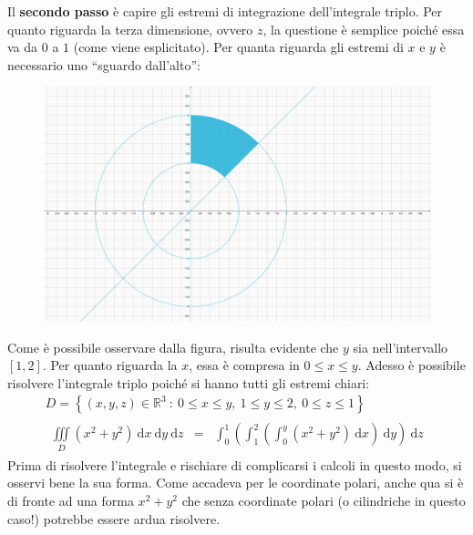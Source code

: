 \documentclass[a4paper]{article}
\newcommand{\dquotes}[1]{``#1''}
\begin{document}
	\noindent
	Il \textbf{secondo passo} è capire gli estremi di integrazione dell'integrale triplo. Per quanto riguarda la terza dimensione, ovvero $z$, la questione è semplice poiché essa va da $0$ a $1$ (come viene esplicitato). Per quanta riguarda gli estremi di $x$ e $y$ è necessario uno \dquotes{sguardo dall'alto}:
	\begin{figure}[!htp]
		\centering
		\includegraphics[width=.7\textwidth]{img/integrali_tripli-coordinate_cilindriche_5.pdf}
	\end{figure}

	\noindent
	Come è possibile osservare dalla figura, risulta evidente che $y$ sia nell'intervallo $\left[1,2\right]$. Per quanto riguarda la $x$, essa è compresa in $0 \le x \le y$. Adesso è possibile risolvere l'integrale triplo poiché si hanno tutti gli estremi chiari:
	\begin{gather*}
		D = \left\{\left(x,y,z\right) \in \mathbb{R}^{3} \: : \: 0 \le x \le y, \: 1 \le y \le 2, \: 0 \le z \le 1\right\} \\
		\begin{array}{rcl}
			\displaystyle\iiint\limits_{D} \left(x^{2}+y^{2}\right) \:\mathrm{d}x\:\mathrm{d}y\:\mathrm{d}z
			&=&
			\displaystyle\int_{0}^{1} \left(\int_{1}^{2} \left(\int_{0}^{y} \left(x^{2}+y^{2}\right) \:\mathrm{d}x\right) \:\mathrm{d}y\right) \:\mathrm{d}z
		\end{array}
	\end{gather*}
	Prima di risolvere l'integrale e rischiare di complicarsi i calcoli in questo modo, si osservi bene la sua forma. Come accadeva per le coordinate polari, anche qua si è di fronte ad una forma $x^{2}+y^{2}$ che senza coordinate polari (o cilindriche in questo caso!) potrebbe essere ardua risolvere.
\end{document}
